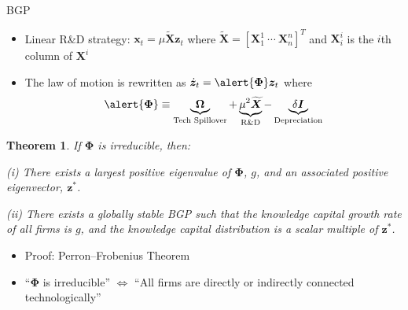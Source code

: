 \documentclass[
  10pt,               %
  aspectratio=169,     %
]{beamer}
\theoremstyle{plain}
\newtheorem*{theorem*}{Theorem}
\begin{document}
\begin{frame}{BGP}
  \begin{itemize}
    \label{bgp}
    \item Linear R\&D strategy: $\bm{x}_{t}=\mu\bm{\widetilde{X}}\bm{z}_{t}$ where $\bm{\widetilde{X}}= \left[\bm{X}_{1}^{1} \ \cdots \ \bm{X}_{n}^{n}\right]^{T}$ and $\bm{X}_{i}^{i}$ is the $i$th column of $\bm{X}^{i}$
    \item The law of motion is rewritten as $\dot{\bm{z}}_{t}=\alert{\bm{\Phi}}\bm{z}_{t}$
          where
          \[
            \alert{\bm{\Phi}}\equiv\underbrace{\bm{\Omega}}_{\text{Tech Spillover}}+\underbrace{\mu^{2}\bm{\widetilde{X}}}_{\text{R\&D}} -\underbrace{\delta\bm{I}}_{\text{Depreciation}}
          \]
          \vspace{-7mm}
  \end{itemize}\pause
  \begin{theorem*}
    If \alert{$\bm{\Phi}$} is irreducible, then:

    (i) There exists a largest positive eigenvalue of \alert{$\bm{\Phi}$}, $g$, and
    an associated positive eigenvector, $\bm{z}^{*}$.

    (ii) There exists a globally stable BGP such that the knowledge capital
    growth rate of all firms is $g$, and the knowledge capital distribution
    is a scalar multiple of $\bm{z}^{*}$.
  \end{theorem*}
  \begin{itemize}
    \item Proof: Perron--Frobenius Theorem
    \item ``\alert{$\bm{\Phi}$} is irreducible'' $\Longleftrightarrow$ ``All firms are
          directly or indirectly connected technologically''
  \end{itemize}
  \hyperlink{symmetric}{}
\end{frame}
\end{document}
